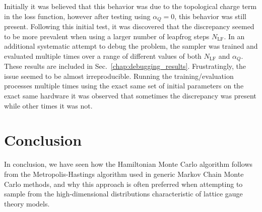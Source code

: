 \documentclass[../main.tex]{subfiles}
\begin{document}
Initially it was believed that this behavior was due to the topological charge
term in the loss function, however after testing using $\alpha_{Q} = 0$, this
behavior was still present.
%
Following this initial test, it was discovered that the discrepancy seemed to
be more prevalent when using a larger number of leapfrog steps
$N_{\mathrm{LF}}$.
%
In an additional systematic attempt to debug the problem, the sampler was
trained and evaluated multiple times over a range of different values of both
$N_{\mathrm{LF}}$ and $\alpha_{Q}$.
%
These results are included in Sec.~\ref{chap:debugging_results}.
%
Frustratingly, the issue seemed to be almost irreproducible.
%
Running the training/evaluation processes multiple times using the exact same
set of initial parameters on the exact same hardware it was observed that
sometimes the discrepancy was present while other times it was not.

\section{Conclusion}%
\label{sec:l2hmc_conclusion}
In conclusion, we have seen how the Hamiltonian Monte Carlo algorithm follows
from the Metropolis-Hastings algorithm used in generic Markov Chain Monte Carlo
methods, and why this approach is often preferred when attempting to sample
from the high-dimensional distributions characteristic of lattice gauge theory
models.
\end{document}
